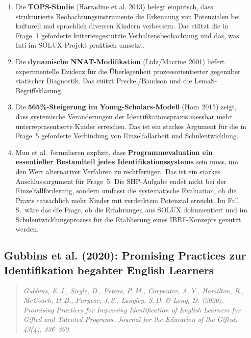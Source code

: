 \documentclass[ngerman, a4paper]{article}
\begin{document}
\begin{enumerate}
  \item Die \textbf{TOPS-Studie} (Harradine et al. 2013) belegt
    empirisch, dass strukturierte Beobachtungsinstrumente die Erkennung
    von Potenzialen bei kulturell und sprachlich diversen Kindern
    verbessern. Das stützt die in Frage~1 geforderte kriteriengestützte
    Verhaltensbeobachtung und das, was Inti im SOLUX-Projekt praktisch
    umsetzt.
  \item Die \textbf{dynamische NNAT-Modifikation} (Lidz/Macrine 2001)
    liefert experimentelle Evidenz für die Überlegenheit
    prozessorientierter gegenüber statischer Diagnostik. Das stützt
    Preckel/Baudson und die LemaS-Begriffsklärung.
  \item Die \textbf{565\%-Steigerung im Young-Scholars-Modell} (Horn
    2015) zeigt, dass systemische Veränderungen der
    Identifikationspraxis messbar mehr unterrepräsentierte Kinder
    erreichen. Das ist ein starkes Argument für die in Frage~5
    geforderte Verbindung von Einzelfallarbeit und Schulentwicklung.
  \item Mun et al.\ formulieren explizit, dass \textbf{Programmevaluation
    ein essentieller Bestandteil jedes Identifikationssystems} sein muss,
    um den Wert alternativer Verfahren zu rechtfertigen. Das ist ein
    starkes Anschlussargument für Frage~5: Die SHP-Aufgabe endet nicht bei
    der Einzelfallförderung, sondern umfasst die systematische Evaluation,
    ob die Praxis tatsächlich mehr Kinder mit verdecktem Potenzial
    erreicht. Im Fall S.\ wäre das die Frage, ob die Erfahrungen aus SOLUX
    dokumentiert und im Schulentwicklungsprozess für die Etablierung eines
    IBBF-Konzepts genutzt werden.
\end{enumerate}


\subsection*{Gubbins et al. (2020): Promising Practices zur Identifikation
  begabter English Learners}
\label{subsec:gubbins2020}

\begin{quote}\itshape
Gubbins, E.\,J., Siegle, D., Peters, P.\,M., Carpenter, A.\,Y.,
Hamilton, R., McCoach, D.\,B., Puryear, J.\,S., Langley, S.\,D.
\& Long, D. (2020). Promising Practices
for Improving Identification of English Learners for Gifted and Talented
Programs. \upshape Journal for the Education of the Gifted, 43(4),
336--369.
\end{quote}
\end{document}
